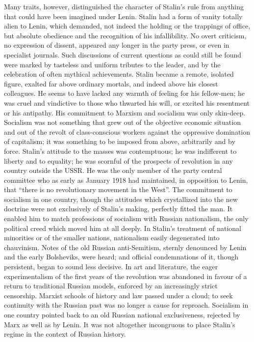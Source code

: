 Many traits, however, distinguished the character of Stalin's rule from anything that could have been imagined under Lenin. Stalin had a form of vanity totally alien to Lenin, which demanded, not indeed the holding or the trappings of office, but absolute obedience and the recognition of his infallibility. No overt criticism, no expression of dissent, appeared any longer in the party press, or even in specialist journals. Such discussions of current questions as could still be found were marked by tasteless and uniform tributes to the leader, and by the celebration of often mythical achievements. Stalin became a remote, isolated figure, exalted far above ordinary mortals, and indeed above his closest colleagues. He seems to have lacked any warmth of feeling for his fellow-men; he was cruel and vindictive to those who thwarted his will, or excited his resentment or his antipathy. His commitment to Marxism and socialism was only skin-deep. Socialism was not something that grew out of the objective economic situation and out of the revolt of class-conscious workers against the oppressive domination of capitalism; it was something to be imposed from above, arbitrarily and by force. Stalin's attitude to the masses was contemptuous; he was indifferent to liberty and to equality; he was scornful of the prospects of revolution in any country outside the USSR. He was the only member of the party central committee who as early as January 1918 had maintained, in opposition to Lenin, that ``there is no revolutionary movement in the West''. The commitment to socialism in one country, though the attitudes which crystallized into the new doctrine were not exclusively of Stalin's making, perfectly fitted the man. It enabled him to match professions of socialism with Russian nationalism, the only political creed which moved him at all deeply. In Stalin's treatment of national minorities or of the smaller nations, nationalism easily degenerated into chauvinism. Notes of the old Russian anti-Semitism, sternly denounced by Lenin and the early Bolsheviks, were heard; and official condemnations of it, though persistent, began to sound less decisive. In art and literature, the eager experimentalism of the first years of the revolution was abandoned in favour of a return to traditional Russian models, enforced by an increasingly strict censorship. Marxist schools of history and law passed under a cloud; to seek continuity with the Russian past was no longer a cause for reproach. Socialism in one country pointed back to an old Russian national exclusiveness, rejected by Marx as well as by Lenin. It was not altogether incongruous to place Stalin's regime in the context of Russian history. 

